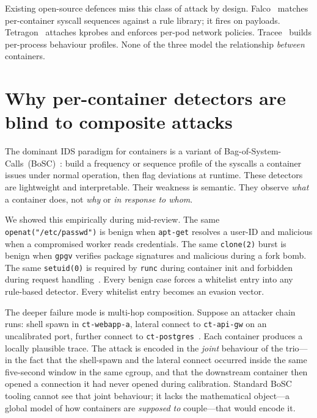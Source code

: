 Existing open-source defences miss this class of attack by design.
Falco~\cite{falco2024} matches per-container syscall sequences against a rule
library; it fires on payloads. Tetragon~\cite{tetragon2024} attaches kprobes
and enforces per-pod network policies. Tracee~\cite{tracee2024} builds
per-process behaviour profiles. None of the three model the relationship
\emph{between} containers.

\section{Why per-container detectors are blind to composite attacks}
\label{sec:bosc-blindness}

The dominant IDS paradigm for containers is a variant of
Bag-of-System-Calls~(BoSC)~\cite{bertinatto2024,kotenko2024}: build a
frequency or sequence profile of the syscalls a container issues under normal
operation, then flag deviations at runtime. These detectors are lightweight
and interpretable. Their weakness is semantic. They observe \emph{what} a
container does, not \emph{why} or \emph{in response to whom}.

We showed this empirically during mid-review. The same
\texttt{openat("/etc/passwd")} is benign when \texttt{apt-get} resolves a
user-ID and malicious when a compromised worker reads credentials. The same
\texttt{clone(2)} burst is benign when \texttt{gpgv} verifies package
signatures and malicious during a fork bomb. The same \texttt{setuid(0)} is
required by \texttt{runc} during container init and forbidden during request
handling~\cite{ghimire2025patrol}. Every benign case forces a whitelist entry into
any rule-based detector. Every whitelist entry becomes an evasion vector.

The deeper failure mode is multi-hop composition. Suppose an attacker chain
runs: shell spawn in \texttt{ct-webapp-a}, lateral connect to
\texttt{ct-api-gw} on an uncalibrated port, further connect to
\texttt{ct-postgres}~\cite{he2023cross}. Each container produces a locally
plausible trace. The attack is encoded in the \emph{joint} behaviour of the
trio---in the fact that the shell-spawn and the lateral connect occurred
inside the same five-second window in the same cgroup, and that the
downstream container then opened a connection it had never opened during
calibration. Standard BoSC tooling cannot see that joint behaviour; it lacks
the mathematical object---a global model of how containers are \emph{supposed
to} couple---that would encode it.

